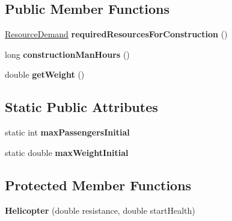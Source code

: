 \subsection*{Public Member Functions}
\begin{DoxyCompactItemize}
\item 
\hyperlink{classuniverse_1_1_resource_demand}{Resource\+Demand} {\bfseries required\+Resources\+For\+Construction} ()\hypertarget{classtools_1_1vehicles_1_1air_1_1_helicopter_a23cea91d891f0097c7e6e69187b57b11}{}\label{classtools_1_1vehicles_1_1air_1_1_helicopter_a23cea91d891f0097c7e6e69187b57b11}

\item 
long {\bfseries construction\+Man\+Hours} ()\hypertarget{classtools_1_1vehicles_1_1air_1_1_helicopter_a67421e5a7ae8692d11bf083297ba950a}{}\label{classtools_1_1vehicles_1_1air_1_1_helicopter_a67421e5a7ae8692d11bf083297ba950a}

\item 
double {\bfseries get\+Weight} ()\hypertarget{classtools_1_1vehicles_1_1air_1_1_helicopter_a31e1044973af41bcc2211be9ce6f98d4}{}\label{classtools_1_1vehicles_1_1air_1_1_helicopter_a31e1044973af41bcc2211be9ce6f98d4}

\end{DoxyCompactItemize}
\subsection*{Static Public Attributes}
\begin{DoxyCompactItemize}
\item 
static int {\bfseries max\+Passengers\+Initial}\hypertarget{classtools_1_1vehicles_1_1air_1_1_helicopter_a4384115cb080253d51f001c72f925e69}{}\label{classtools_1_1vehicles_1_1air_1_1_helicopter_a4384115cb080253d51f001c72f925e69}

\item 
static double {\bfseries max\+Weight\+Initial}\hypertarget{classtools_1_1vehicles_1_1air_1_1_helicopter_a3d01f8b0c9a95dbbadc9fa5951883372}{}\label{classtools_1_1vehicles_1_1air_1_1_helicopter_a3d01f8b0c9a95dbbadc9fa5951883372}

\end{DoxyCompactItemize}
\subsection*{Protected Member Functions}
\begin{DoxyCompactItemize}
\item 
{\bfseries Helicopter} (double resistance, double start\+Health)\hypertarget{classtools_1_1vehicles_1_1air_1_1_helicopter_abac1c2d96748f7c7d16ba83d699aa8a9}{}\label{classtools_1_1vehicles_1_1air_1_1_helicopter_abac1c2d96748f7c7d16ba83d699aa8a9}

\end{DoxyCompactItemize}
